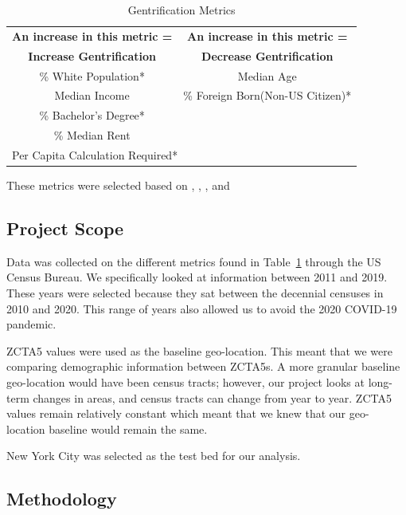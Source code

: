 \documentclass[conference]{IEEEtran}
\begin{document}
\begin{table}[htbp]
\caption{Gentrification Metrics}
\begin{center}
\begin{tabular}{cc}
\hline\hline
\textbf{An increase in this metric =} & \textbf{An increase in this metric =} \\
\textbf{Increase Gentrification} & \textbf{Decrease Gentrification} \\
\hline
\% White Population* & Median Age                                   \\
Median Income        & \% Foreign Born(Non-US Citizen)*              \\
\% Bachelor's Degree* & \\
\% Median Rent &\\
\hline\hline
\multicolumn{2}{l}{Per Capita Calculation Required*}
\end{tabular}
\label{gen_metrics}
\end{center}
\end{table}

These metrics were selected based on \cite{b1}, \cite{b2}, \cite{b3}, and \cite{b4}

\subsection{Project Scope}
Data was collected on the different metrics found in Table~\ref{gen_metrics} through the US Census Bureau. We specifically looked at information between 2011 and 2019. These years were selected because they sat between the decennial censuses in 2010 and 2020. This range of years also allowed us to avoid the 2020 COVID-19 pandemic.

ZCTA5 values were used as the baseline geo-location. This meant that we were comparing demographic information between ZCTA5s. A more granular baseline geo-location would have been census tracts; however, our project looks at long-term changes in areas, and census tracts can change from year to year. ZCTA5 values remain relatively constant which meant that we knew that our geo-location baseline would remain the same.

New York City was selected as the test bed for our analysis.

\subsection{Methodology}
\end{document}
